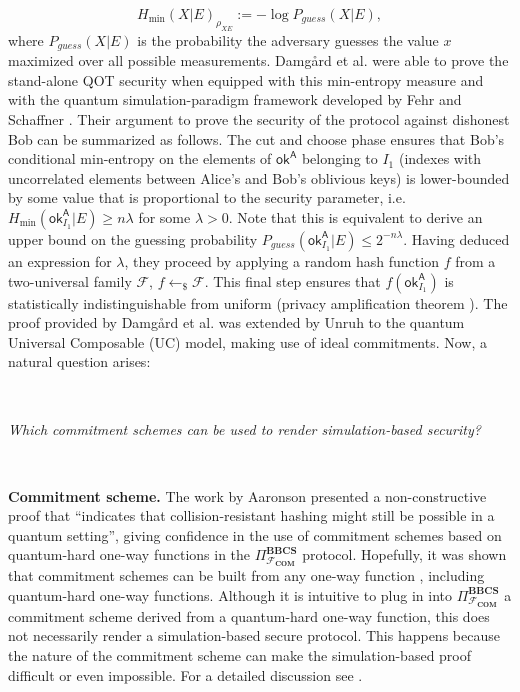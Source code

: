 $$H_{\text{min}}(X | E)_{\rho_{X E}} := -\log P_{guess}(X|E),$$
where $P_{guess}(X|E)$ is the probability the adversary guesses the value $x$ maximized over all possible measurements. Damg{\aa}rd et al. \cite{DFLSS09} were able to prove the stand-alone QOT security when equipped with this min-entropy measure and with the quantum simulation-paradigm framework developed by Fehr and Schaffner \cite{FS09}. Their argument to prove the security of the protocol against dishonest Bob can be summarized as follows. The cut and choose phase ensures that Bob's conditional min-entropy on the elements of $\mathsf{ok}^{\mathsf{A}}$ belonging to $I_{1}$ (indexes with uncorrelated elements between Alice's and Bob's oblivious keys) is lower-bounded by some value that is proportional to the security parameter, i.e. $H_{\text{min}}(\mathsf{ok}^{\mathsf{A}}_{I_{1}} | E) \geq n\lambda$ for some $\lambda > 0$. Note that this is equivalent to derive an upper bound on the guessing probability $P_{guess}(\mathsf{ok}^{\mathsf{A}}_{I_{1}}|E) \leq 2^{-n\lambda}$. Having deduced an expression for $\lambda$, they proceed by applying a random hash function $f$ from a two-universal family $\mathcal{F}$, $f\leftarrow_{\$}\mathcal{F}$. This final step ensures that $f(\mathsf{ok}^{\mathsf{A}}_{I_{1}})$ is statistically indistinguishable from uniform (privacy amplification theorem \cite{DFRSS07, RK05, R05}). The proof provided by Damg{\aa}rd et al. \cite{DFLSS09} was extended by Unruh \cite{U10} to the quantum Universal Composable (UC) model, making use of ideal commitments. Now, a natural question arises: 

\

\centerline{\textit{Which commitment schemes can be used to render simulation-based security?}}

\

\noindent\textbf{Commitment scheme.} The work by Aaronson \cite{A02} presented a non-constructive proof that ``indicates that collision-resistant hashing might still be possible in a quantum setting'', giving confidence in the use of commitment schemes based on quantum-hard one-way functions in the $\Pi^{\textbf{BBCS}}_{\mathcal{F}_{\textbf{COM}}}$ protocol. Hopefully, it was shown that commitment schemes can be built from any one-way function \cite{N91, HILL99, HR07}, including quantum-hard one-way functions. Although it is intuitive to plug in into $\Pi^{\textbf{BBCS}}_{\mathcal{F}_{\textbf{COM}}}$ a commitment scheme derived from a quantum-hard one-way function, this does not necessarily render a simulation-based secure protocol. This happens because the nature of the commitment scheme can make the simulation-based proof difficult or even impossible. For a detailed discussion see \cite{GLSV21}.

